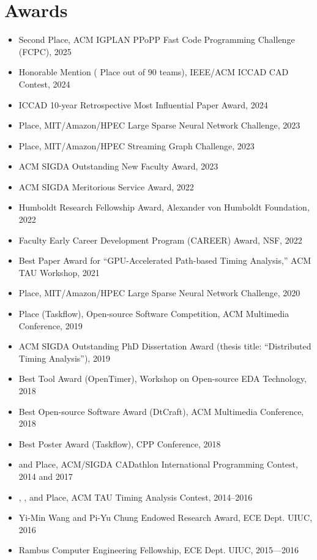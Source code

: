 \documentclass[A4,11pt]{article}
\begin{document}
\section{Awards}
 \begin{itemize}
 \itemsep-3pt
    \item Second Place, ACM IGPLAN PPoPP Fast Code Programming Challenge (FCPC), 2025
    \item Honorable Mention ( Place out of 90 teams), IEEE/ACM ICCAD CAD Contest, 2024
    \item ICCAD 10-year Retrospective Most Influential Paper Award, 2024
    \item {} Place, MIT/Amazon/HPEC Large Sparse Neural Network Challenge, 2023
    \item {} Place, MIT/Amazon/HPEC Streaming Graph Challenge, 2023
    \item ACM SIGDA Outstanding New Faculty Award, 2023
    \item ACM SIGDA Meritorious Service Award, 2022
    \item Humboldt Research Fellowship Award, Alexander von Humboldt Foundation, 2022
    \item Faculty Early Career Development Program (CAREER) Award, NSF, 2022
    \item Best Paper Award for ``GPU-Accelerated Path-based Timing Analysis,'' ACM TAU Workshop, 2021
    \item {} Place, MIT/Amazon/HPEC Large Sparse Neural Network Challenge, 2020
    \item {} Place (Taskflow), Open-source Software Competition, ACM Multimedia Conference, 2019
    \item ACM SIGDA Outstanding PhD Dissertation Award (thesis title: ``Distributed Timing Analysis''), 2019
    \item Best Tool Award (OpenTimer), Workshop on Open-source EDA Technology, 2018
    \item Best Open-source Software Award (DtCraft), ACM Multimedia Conference, 2018
    \item Best Poster Award (Taskflow), CPP Conference, 2018
    \item {} and  Place, ACM/SIGDA CADathlon International Programming Contest, 2014 and 2017
    \item {}, , and  Place, ACM TAU Timing Analysis Contest, 2014--2016
    \item Yi-Min Wang and Pi-Yu Chung Endowed Research Award, ECE Dept. UIUC, 2016
    \item Rambus Computer Engineering Fellowship, ECE Dept. UIUC, 2015—2016

\end{itemize}
\end{document}
